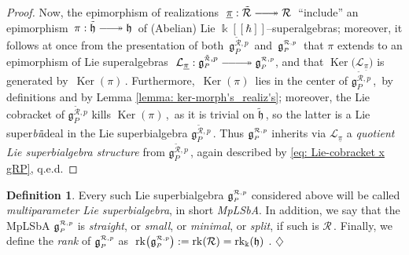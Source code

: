 \documentclass[12pt,reqno,twoside,a4paper]{amsart}
\numberwithin{equation}{section}
\theoremstyle{definition}
\newtheorem{definition}[lema]{Definition}
\newtheorem{free text}[lema]{}
\theoremstyle{remark}
\newcommand \rk{\operatorname{rk}}
\newcommand \Ker{\operatorname{Ker}}
\newcommand{\R}{{\mathcal R}}
\def \kh{{\Bbbk[[\hbar]]}}
\def \L {\mathcal{L}}
\def \Ppicc {{\scriptscriptstyle P}}
\def \Rpicc {{\scriptscriptstyle \R}}
\def \lieg{\mathfrak{g}}
\def \liegRpP{\mathfrak{g}^{\raise1pt\hbox{$ \scriptscriptstyle \mathcal{R},p $}}_\Ppicc}
\def \lieh{\mathfrak{h}}
\theoremstyle{plain}
\begin{document}
\begin{proof}
                                                                  \par
   Now, the epimorphism of realizations  $ \; \underline{\pi} : \tilde{\R} \relbar\joinrel\relbar\joinrel\twoheadrightarrow \R \; $  ``include'' an epimorphism  $ \, \pi : \tilde{\lieh} \relbar\joinrel\relbar\joinrel\twoheadrightarrow \lieh \, $  of (Abelian) Lie  $ \kh $--superalgebras; moreover, it follows at once from the presentation of both  $ \, \lieg_\Ppicc^{\tilde{\Rpicc},p} \, $  and  $ \, \liegRpP \, $  that  $ \pi $  extends to an epimorphism of Lie superalgebras  $ \; \L_{\underline{\pi}} : \lieg_\Ppicc^{\tilde{\Rpicc},p} \relbar\joinrel\relbar\joinrel\relbar\joinrel\twoheadrightarrow \liegRpP $,  \;and that
   $ \Ker\big(\L_{\underline{\pi}}\big) $  is generated by  $ \, \Ker(\pi) \, $.  Furthermore,
   $ \, \Ker(\pi) \, $  lies in the center of  $ \lieg_\Ppicc^{\tilde{\Rpicc},p} \, $,  \,by definitions and by  Lemma \ref{lemma: ker-morph's_realiz's};  moreover, the Lie cobracket of
   $ \lieg_\Ppicc^{\tilde{\Rpicc},p} $  kills  $ \Ker(\pi) \, $,  \,as it is trivial on  $
   \tilde{\lieh} \, $,  so the latter is a Lie  super\textsl{bi\/}ideal  in the Lie superbialgebra  $ \lieg_\Ppicc^{\tilde{\Rpicc},p} \, $.  Thus  $ \liegRpP $  inherits via
   $ \L_{\underline{\pi}} $  a  \textsl{quotient Lie superbialgebra structure\/}  from  $ \lieg_\Ppicc^{\tilde{\Rpicc},p} \, $,  again described by  \eqref{eq: Lie-cobracket x gRP},
   q.e.d.
%
\end{proof}

\vskip9pt

\begin{definition}  \label{def: MpLSbA's}
%
   Every such Lie superbialgebra  $ \liegRpP $  considered above will be called  \textit{multiparameter Lie superbialgebra},  in short  \textit{MpLSbA}.
   In addition, we say that the MpLSbA  $ \liegRpP $  is  \textsl{straight},
   or \textsl{small},  or \textsl{minimal},  or  \textsl{split},  if such is  $ \R \, $.
%
 \vskip3pt
%
   Finally, we define the  \textsl{rank\/}  of  $ \liegRpP $  as  $ \; \rk\!\big( \liegRpP \big) := \rk(\R) = \rk_\Bbbk(\lieh) \; $.   \hfill  $ \diamondsuit $
%
\end{definition}

\vskip9pt
\end{document}

